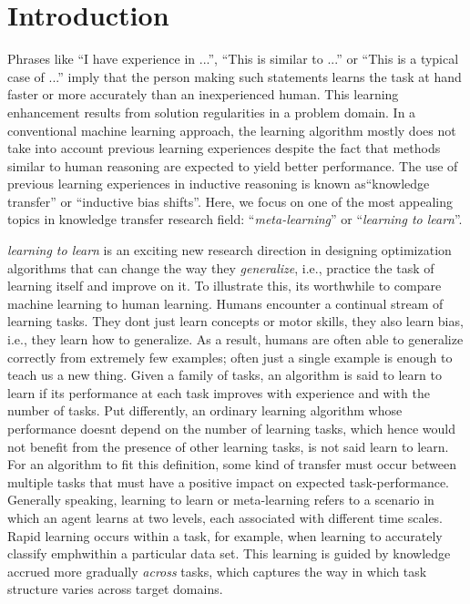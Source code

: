 \documentclass[a4paper, 11pt]{article}
\begin{document}
\section{Introduction}
Phrases like \enquote{I have experience in ...}, \enquote{This is similar to ...} or \enquote{This is a typical case of ...} imply that the person making such statements learns the task at hand faster or more accurately than an inexperienced human. This learning enhancement results from solution regularities in a problem domain. In a conventional machine learning approach, the learning algorithm mostly does not take into account previous learning experiences despite the fact that methods similar to human reasoning are expected to yield better performance. The use of previous learning experiences in inductive reasoning is known as\enquote{knowledge transfer} or  \enquote{inductive bias shifts}. Here, we focus on one of the most appealing topics in knowledge transfer research field: \enquote{\textit{meta-learning}} or \enquote{\textit{learning to learn}}.

\emph{learning to learn} is an exciting new research direction in designing optimization algorithms that can change the way they \emph{generalize}, i.e., practice the task of learning itself and improve on it. To illustrate this, it\textsc{}s worthwhile to compare machine learning to human learning. Humans encounter a continual stream of learning tasks. They don\textsc{}t just learn concepts or motor skills, they also learn bias, i.e., they learn how to generalize. As a result, humans are often able to generalize correctly from extremely few examples; often just a single example is enough to teach us a new thing.
Given a family of tasks, an algorithm is said to learn to learn if its performance at each task improves with experience and with the number of tasks. Put differently, an ordinary learning algorithm whose performance doesn\textsc{}t depend on the number of learning tasks, which hence would not benefit from the presence of other learning tasks, is not said learn to learn. For an algorithm to fit this definition, some kind of transfer must occur between multiple tasks that must have a positive impact on expected task-performance. Generally speaking, learning to learn or meta-learning refers to a scenario in which an agent learns at two levels, each associated with different time scales. Rapid learning occurs within a task, for example, when learning to accurately classify emph{within} a particular data set. This learning is guided by knowledge accrued more gradually \emph{across} tasks, which captures the way in which task structure varies across target domains.
\end{document}
